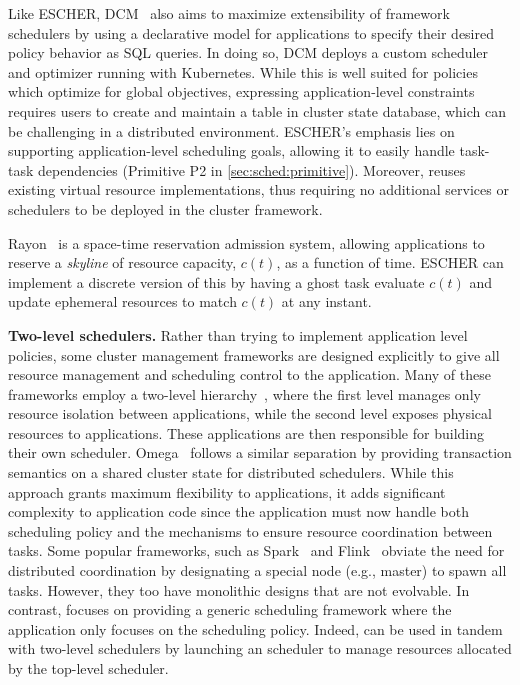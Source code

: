 Like ESCHER, DCM~\cite{dcm-osdi20} also aims to maximize extensibility of framework schedulers by using a declarative model for applications to specify their desired policy behavior as SQL queries. In doing so, DCM deploys a custom scheduler and optimizer running with Kubernetes.
While this is well suited for policies which optimize for global objectives, expressing application-level constraints requires users to create and maintain a table in cluster state database, which can be challenging in a distributed environment. ESCHER's emphasis lies on supporting application-level scheduling goals, allowing it to easily handle task-task dependencies (Primitive P2 in \cref{sec:sched:primitive}). Moreover, \name{} reuses existing virtual resource implementations, thus requiring no additional services or schedulers to be deployed in the cluster framework.

Rayon~\cite{rayon} is a space-time reservation admission system, allowing applications to reserve a \textit{skyline} of resource capacity, $c(t)$, as a function of time. ESCHER can implement a discrete version of this by having a ghost task evaluate $c(t)$ and update ephemeral resources to match $c(t)$ at any instant.

\noindent\textbf{Two-level schedulers.}
Rather than trying to implement application level policies, some cluster management frameworks are designed explicitly to give all resource management and scheduling control to the application.
Many of these frameworks employ a two-level hierarchy~\cite{yarn,mesos}, where the first level manages only resource isolation between applications, while the second level exposes physical resources to applications. These applications are then responsible for building their own scheduler. Omega~\cite{omega} follows a similar separation by providing transaction semantics on a shared cluster state for distributed schedulers.
While this approach grants maximum flexibility to applications, it adds significant complexity to application code since the application must now handle both scheduling policy and the mechanisms to ensure resource coordination between tasks.
Some popular frameworks, such as Spark~\cite{spark} and Flink~\cite{carbone2015flink} obviate the need for distributed coordination by designating a special node (e.g., master) to spawn all tasks. However, they too have monolithic designs that are not evolvable.
In contrast, \name{} focuses on providing a generic scheduling framework where the application only focuses on the scheduling policy.
Indeed, \name{} can be used in tandem with two-level schedulers by launching an \name{} scheduler to manage resources allocated by the top-level scheduler.




